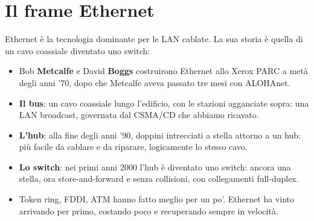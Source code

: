 \section{Il frame Ethernet}

Ethernet è la tecnologia dominante per le LAN cablate. La sua storia è quella di un cavo coassiale diventato uno switch:

\begin{itemize}
    \item Bob \textbf{Metcalfe} e David \textbf{Boggs} costruirono Ethernet allo Xerox PARC a metà degli anni '70, dopo che Metcalfe aveva
          passato tre mesi con ALOHAnet.
    \item \textbf{Il bus}: un cavo coassiale lungo l'edificio, con le stazioni agganciate sopra: una LAN broadcast, governata dal CSMA/CD
          che abbiamo ricavato.
    \item \textbf{L'hub}: alla fine degli anni '90, doppini intrecciati a stella attorno a un hub: più facile da cablare e da riparare,
          logicamente lo stesso cavo.
    \item \textbf{Lo switch}: nei primi anni 2000 l'hub è diventato uno switch: ancora una stella, ora store-and-forward e senza
          collisioni, con collegamenti full-duplex.
    \item Token ring, FDDI, ATM hanno fatto meglio per un po'. Ethernet ha vinto arrivando per primo, costando poco e recuperando
          sempre in velocità.
\end{itemize}

